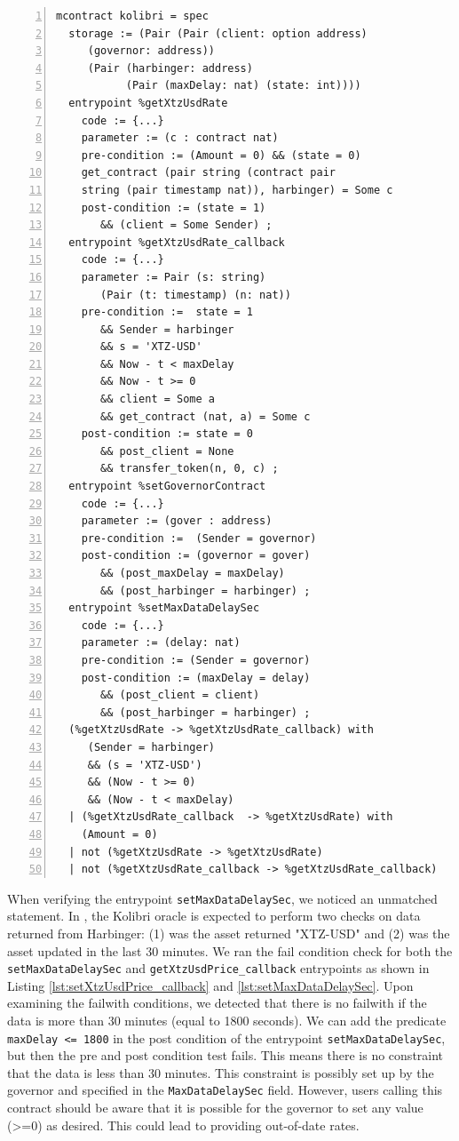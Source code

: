 \documentclass[a4paper,USenglish,cleveref, autoref,anonymous]{lipics-v2021}
\begin{document}
\begin{lstlisting}[float=tp,captionpos=b,caption={Kolibri oracle contract specification},label={lst:kolibri-contract-specification},numbers=left]
mcontract kolibri = spec 
  storage := (Pair (Pair (client: option address) 
     (governor: address))
     (Pair (harbinger: address) 
           (Pair (maxDelay: nat) (state: int))))
  entrypoint %getXtzUsdRate
    code := {...}
    parameter := (c : contract nat) 
    pre-condition := (Amount = 0) && (state = 0)
    get_contract (pair string (contract pair 
    string (pair timestamp nat)), harbinger) = Some c
    post-condition := (state = 1) 
       && (client = Some Sender) ;
  entrypoint %getXtzUsdRate_callback
    code := {...}
    parameter := Pair (s: string) 
       (Pair (t: timestamp) (n: nat))
    pre-condition :=  state = 1 
       && Sender = harbinger  
       && s = 'XTZ-USD' 
       && Now - t < maxDelay 
       && Now - t >= 0 
       && client = Some a 
       && get_contract (nat, a) = Some c    
    post-condition := state = 0 
       && post_client = None 
       && transfer_token(n, 0, c) ;
  entrypoint %setGovernorContract
    code := {...}
    parameter := (gover : address) 
    pre-condition :=  (Sender = governor)                  
    post-condition := (governor = gover) 
       && (post_maxDelay = maxDelay) 
       && (post_harbinger = harbinger) ;
  entrypoint %setMaxDataDelaySec
    code := {...}
    parameter := (delay: nat)
    pre-condition := (Sender = governor)             
    post-condition := (maxDelay = delay) 
       && (post_client = client) 
       && (post_harbinger = harbinger) ;
  (%getXtzUsdRate -> %getXtzUsdRate_callback) with
     (Sender = harbinger)
     && (s = 'XTZ-USD') 
     && (Now - t >= 0)  
     && (Now - t < maxDelay)  
  | (%getXtzUsdRate_callback  -> %getXtzUsdRate) with 
    (Amount = 0) 
  | not (%getXtzUsdRate -> %getXtzUsdRate) 
  | not (%getXtzUsdRate_callback -> %getXtzUsdRate_callback)
\end{lstlisting}
When verifying the entrypoint \lstinline/setMaxDataDelaySec/, we noticed an unmatched statement. In \cite{kolibri}, the Kolibri oracle is expected to perform two checks on data returned from Harbinger: (1) was the asset returned "XTZ-USD" and (2) was the asset updated in the last 30 minutes. We ran the fail condition check for both the \lstinline/setMaxDataDelaySec/ and \lstinline/getXtzUsdPrice_callback/ entrypoints as shown in Listing \ref{lst:setXtzUsdPrice_callback} and \ref{lst:setMaxDataDelaySec}. Upon examining the failwith conditions, we detected that there is no failwith if the data is more than 30 minutes (equal to 1800 seconds). We can add the predicate \lstinline/maxDelay <= 1800/ in the post condition of the entrypoint \lstinline/setMaxDataDelaySec/, but then the pre and post condition test fails. This means there is no constraint that the data is less than 30 minutes. This constraint is possibly set up by the governor and specified in the \lstinline/MaxDataDelaySec/ field. However, users calling this contract should be aware that it is possible for the governor to set any value (>=0) as desired. This could lead to providing out-of-date rates.
\end{document}
